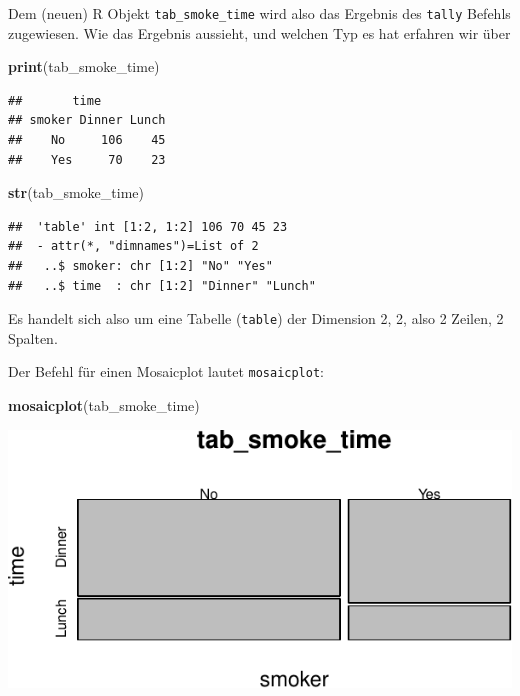 \documentclass[12pt,ngerman,paper=a4,pagesize,DIV=13]{scrreprt}
\newenvironment{Shaded}{\begin{snugshade}}{\end{snugshade}}
\newcommand{\KeywordTok}[1]{\textcolor[rgb]{0.13,0.29,0.53}{\textbf{#1}}}
\newcommand{\NormalTok}[1]{#1}
\begin{document}
Dem (neuen) R Objekt \texttt{tab\_smoke\_time} wird also das Ergebnis
des \texttt{tally} Befehls zugewiesen. Wie das Ergebnis aussieht, und
welchen Typ es hat erfahren wir über

\begin{Shaded}
\begin{Highlighting}[]
\KeywordTok{print}\NormalTok{(tab_smoke_time)}
\end{Highlighting}
\end{Shaded}

\begin{verbatim}
##       time
## smoker Dinner Lunch
##    No     106    45
##    Yes     70    23
\end{verbatim}

\begin{Shaded}
\begin{Highlighting}[]
\KeywordTok{str}\NormalTok{(tab_smoke_time)}
\end{Highlighting}
\end{Shaded}

\begin{verbatim}
##  'table' int [1:2, 1:2] 106 70 45 23
##  - attr(*, "dimnames")=List of 2
##   ..$ smoker: chr [1:2] "No" "Yes"
##   ..$ time  : chr [1:2] "Dinner" "Lunch"
\end{verbatim}

Es handelt sich also um eine Tabelle (\texttt{table}) der Dimension 2,
2, also 2 Zeilen, 2 Spalten.

Der Befehl für einen Mosaicplot lautet \texttt{mosaicplot}:

\begin{Shaded}
\begin{Highlighting}[]
\KeywordTok{mosaicplot}\NormalTok{(tab_smoke_time)}
\end{Highlighting}
\end{Shaded}

\includegraphics{DatenerhebungStatistik-Uebung_files/figure-latex/unnamed-chunk-52-1.pdf}
\end{document}
